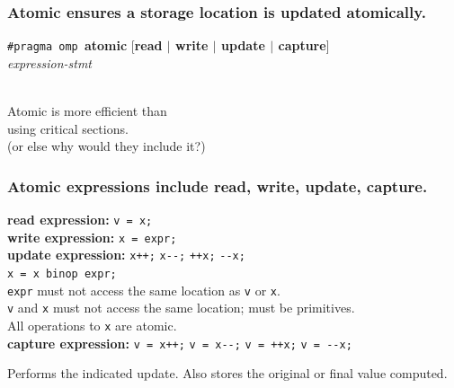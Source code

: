\begin{frame}[fragile]
  \frametitle{Atomic ensures a storage location is updated atomically.}

  \Large
  \begin{changemargin}{1.5cm}
  \begin{center}
    {\tt \#pragma omp }{\bf atomic} [{\bf read $\mid$ write $\mid$ update $\mid$ capture}]\\
    {\it expression-stmt}
  \end{center}~\\

    Atomic is more efficient than\\
 using critical sections. \\
      \hspace*{2em} (or else why would they
      include it?)\\[2em]

  \end{changemargin}

\end{frame}

\begin{frame}[fragile]
  \frametitle{Atomic expressions include read, write, update, capture.}

  \begin{changemargin}{1cm}

  {\bf read expression:} {\tt v = x;}\\[1em]

  {\bf write expression:} {\tt x = expr;}\\[1em]

  {\bf update expression:} {\tt x++;} {\tt x{-}-;} {\tt ++x;} {\tt -{-}x;}\\
  \hspace{9em}{\tt x binop= expr;} {\tt x = x binop expr;}\\[1em]

    {\tt expr} must not access the same location as {\tt v} or {\tt x}.\\
    {\tt v} and {\tt x} must not access the same location; must be
      primitives.\\
    All operations to {\tt x} are atomic.\\[2em]

  {\bf capture expression:} {\tt v = x++;} {\tt v = x{-}-;} {\tt v = ++x;}
  {\tt v = -{-}x;}\\ \hspace{9.2em}{\tt v = x binop= expr;}

  Performs the indicated update. Also stores the original or
  final value computed.
  \end{changemargin}

\end{frame}


